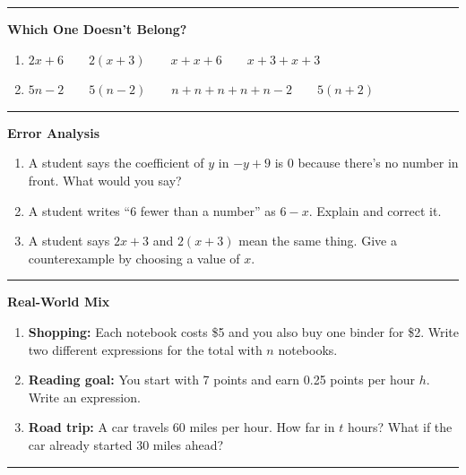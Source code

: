 \documentclass[
  letterpaper,
  DIV=11,
  numbers=noendperiod]{scrreprt}
\providecommand{\tightlist}{%
  \setlength{\itemsep}{0pt}\setlength{\parskip}{0pt}}
\begin{document}
\begin{center}\rule{0.5\linewidth}{0.5pt}\end{center}

\textbf{Which One Doesn't Belong?}

\begin{enumerate}
\def\labelenumi{\arabic{enumi}.}
\setcounter{enumi}{15}
\tightlist
\item
  \(2x+6\)  \(2(x+3)\)  \(x+x+6\)  \(x+3+x+3\)
\item
  \(5n-2\)  \(5(n-2)\)  \(n+n+n+n+n-2\)  \(5(n+2)\)
\end{enumerate}

\begin{center}\rule{0.5\linewidth}{0.5pt}\end{center}

\textbf{Error Analysis}

\begin{enumerate}
\def\labelenumi{\arabic{enumi}.}
\setcounter{enumi}{17}
\tightlist
\item
  A student says the coefficient of \(y\) in \(-y+9\) is 0 because
  there's no number in front. What would you say?
\item
  A student writes ``6 fewer than a number'' as \(6-x\). Explain and
  correct it.
\item
  A student says \(2x+3\) and \(2(x+3)\) mean the same thing. Give a
  counterexample by choosing a value of \(x\).
\end{enumerate}

\begin{center}\rule{0.5\linewidth}{0.5pt}\end{center}

\textbf{Real-World Mix}

\begin{enumerate}
\def\labelenumi{\arabic{enumi}.}
\setcounter{enumi}{20}
\tightlist
\item
  \textbf{Shopping:} Each notebook costs \$5 and you also buy one binder
  for \$2. Write two different expressions for the total with \(n\)
  notebooks.
\item
  \textbf{Reading goal:} You start with 7 points and earn 0.25 points
  per hour \(h\). Write an expression.
\item
  \textbf{Road trip:} A car travels 60 miles per hour. How far in \(t\)
  hours? What if the car already started 30 miles ahead?
\end{enumerate}

\begin{center}\rule{0.5\linewidth}{0.5pt}\end{center}
\end{document}
